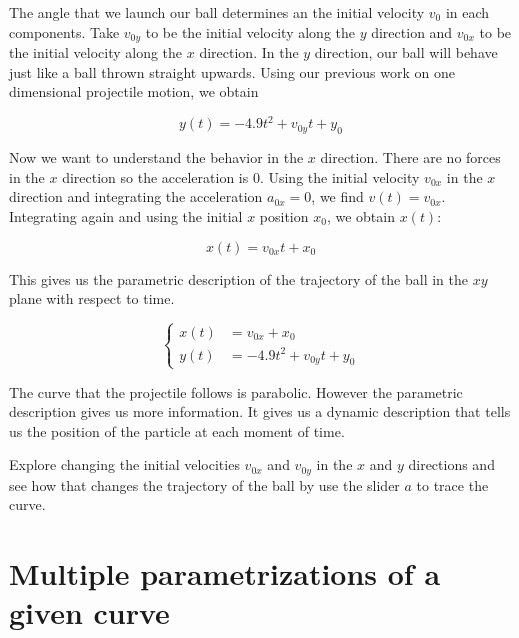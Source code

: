 \documentclass{ximera}
\begin{document}
\begin{example}
\begin{explanation}
The angle that we launch our ball determines an the initial velocity $v_{0}$ in each components. Take $v_{0y}$ to be the initial velocity  along the $y$ direction and $v_{0x}$ to be the initial velocity along the $x$ direction. In the $y$ direction, our ball will behave just like a ball thrown straight upwards. Using our previous work on one dimensional projectile motion, we obtain

\[
y(t)=-4.9t^2+v_{0y}t+y_{0}
\]

Now we want to understand the behavior in the $x$ direction. There are no forces in the $x$ direction so the acceleration is $0$.   Using the initial velocity  $v_{0x}$ in the $x$ direction and integrating the acceleration $a_{0x}=0$, we find $v(t)=v_{0x}$.  Integrating again and using the initial $x$ position $x_{0}$, we obtain
$x(t)$:

\[
x(t)=v_{0x}t+x_{0}
\]

This gives us the parametric description of the trajectory of the ball in the $xy$ plane with respect to time.

\[
\begin{cases}
x(t)&=v_{0x}+x_{0}\\
y(t)&=-4.9t^2+v_{0y}t+y_{0}
\end{cases}
\]

The curve that the projectile follows is parabolic. However the parametric description gives us more information. It gives us a dynamic description that tells us the position of the particle at each moment of time.

\end{explanation}

\end{example}



\begin{onlineOnly}



Explore changing the initial velocities $v_{0x}$ and $v_{0y}$  in the $x$ and $y$ directions and see how that changes the trajectory of the ball by use the slider $a$ to trace the curve.
\end{onlineOnly}










\section{Multiple parametrizations of a given curve}
\end{document}
